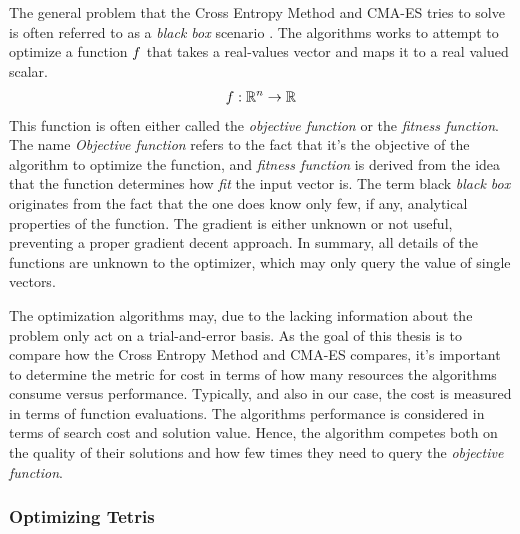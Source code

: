 The general problem that the Cross Entropy Method and CMA-ES 
tries to solve is often referred  to as a \textit{black box}
scenario \citep{hansen2011}. The algorithms works to 
attempt to optimize a function $f$ that takes
a real-values vector and maps it to a real valued scalar.
\begin{align*}
f : \mathbb{R}^{n} \rightarrow \mathbb{R}
\end{align*}
This function is often either called the \textit{objective function}
or the \textit{fitness function}. The name \textit{Objective function}
refers to the fact that it's the objective of the algorithm to optimize
the function, and \textit{fitness function} is derived from the
idea that the function determines how \textit{fit} the input vector
is. The term black \textit{black box} originates from the fact that 
the one does know only few, if any, analytical properties of the function.
The gradient is either unknown or not useful, preventing a 
proper gradient 
decent approach. In summary, all details of the functions are unknown to 
the optimizer, which may only query the value of single vectors.
\begin{figure}[H]
\centering
{}
\end{figure}
The optimization algorithms may, due to the lacking information about the
problem only act on a trial-and-error basis. As the goal of this
thesis is to compare how the Cross Entropy Method and CMA-ES compares, 
it's important to determine the metric for cost in terms of 
how many resources the algorithms consume versus performance.
Typically, and also in our case, the cost is measured in terms 
of function evaluations. The algorithms performance is considered 
in terms of search cost and solution value. Hence, the algorithm 
competes both on the quality of their solutions and how few times
they need to query the \textit{objective function}.


\subsubsection{Optimizing Tetris}


